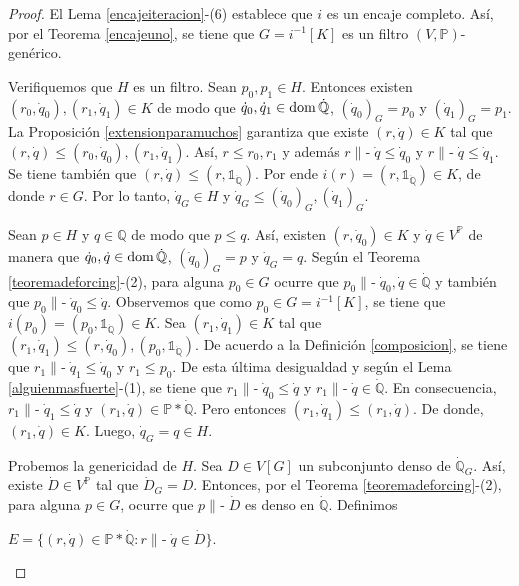 \documentclass[11pt]{unam_tesis1}
\theoremstyle{MyThmStyle}
\theoremstyle{definition}
\theoremstyle{plain}
\theoremstyle{remark}
\def\dom{\mathop{\rm dom}\nolimits}
\def\forces{\mathop{\parallel\!\!\!-}\nolimits}
\let\Vdash\forces
\let\leq\leqslant
\begin{document}
\begin{proof}
El Lema \ref{encajeiteracion}-(6) establece que $i$ es un encaje completo. As\'i, por el Teorema \ref{encajeuno}, se tiene que $G=i^{-1}[K]$ es un filtro $(V,\mathbb P)$-gen\'erico.

Verifiquemos que $H$ es un filtro. Sean $p_0,p_1\in H$. Entonces existen $(r_0,\dot q_0),(r_1,\dot q_1)\in K$ de modo que $\dot q_0,\dot q_1\in \dom \dot{\mathbb Q}$, $(\dot q_0)_G=p_0$ y $(\dot q_1)_G=p_1$. La Proposici\'on \ref{extensionparamuchos} garantiza que existe $(r,\dot q)\in K$ tal que $(r,\dot q)\leq (r_0,\dot q_0),(r_1,\dot q_1)$. As\'i, $r\leq r_0,r_1$ y adem\'as $r\Vdash \dot q\leq \dot q_0$ y $r\Vdash \dot q\leq \dot q_1$. Se tiene tambi\'en que  $(r,\dot q)\leq (r,\mathds 1_{\dot{\mathbb Q}})$. Por ende $i(r)=(r,\mathds 1_{\dot{\mathbb Q}})\in K$, de donde $r\in G$. Por lo tanto, $\dot q_G\in H$ y $\dot q_G\leq (\dot q_0)_G, (\dot q_1)_G$.

Sean $p\in H$ y $q\in \mathbb Q$ de modo que $p\leq q$. As\'i, existen $(r,\dot q_0)\in K$ y $\dot q\in V^{\mathbb P}$ de manera que $\dot q_0,\dot q\in \dom \dot{\mathbb Q}$, $(\dot q_0)_G=p$ y $\dot q_G=q$. Seg\'un el Teorema \ref{teoremadeforcing}-(2), para alguna $p_0\in G$ ocurre que $p_0\Vdash \dot q_0,\dot q\in \dot{\mathbb Q}$ y tambi\'en que $p_0\Vdash \dot q_0\leq \dot q$. Observemos que como $p_0\in G = i^{-1}[K]$, se tiene que $i(p_0)=(p_0,\mathds 1_{\dot{\mathbb Q}} )\in K$. Sea $(r_1,\dot q_1)\in K$ tal que $(r_1,\dot q_1)\leq (r,\dot q_0),(p_0,\mathds 1_{\dot{\mathbb Q}})$. De acuerdo a la Definici\'on \ref{composicion}, se tiene que $r_1\Vdash \dot q_1\leq \dot q_0$ y $r_1\leq p_0$. De esta \'ultima desigualdad y seg\'un el Lema \ref{alguienmasfuerte}-(1), se tiene que $r_1\Vdash \dot q_0\leq \dot q$ y $r_1\Vdash \dot q\in \dot{\mathbb Q}$. En consecuencia, $r_1\Vdash \dot q_1\leq \dot q$ y $(r_1,\dot q)\in \mathbb P*\dot{\mathbb Q}$. Pero entonces $(r_1,\dot q_1)\leq (r_1,\dot q)$. De donde, $(r_1,\dot q)\in K$. Luego, $\dot q_G=q\in H$.

Probemos la genericidad de $H$. Sea $D\in V[G]$ un subconjunto denso de $\dot{\mathbb Q}_G$. As\'i, existe $\dot D\in V^{\mathbb P}$ tal que $\dot{D}_G=D$. Entonces, por el Teorema \ref{teoremadeforcing}-(2), para alguna $p\in G$, ocurre que $p\Vdash \dot D$ es denso en $\dot{\mathbb Q}$. Definimos 

\begin{center}

$E=\{(r,\dot q)\in \mathbb P*\dot{\mathbb Q}:r\Vdash \dot q\in \dot D \}$.


\end{center}
\end{proof}
\end{document}
